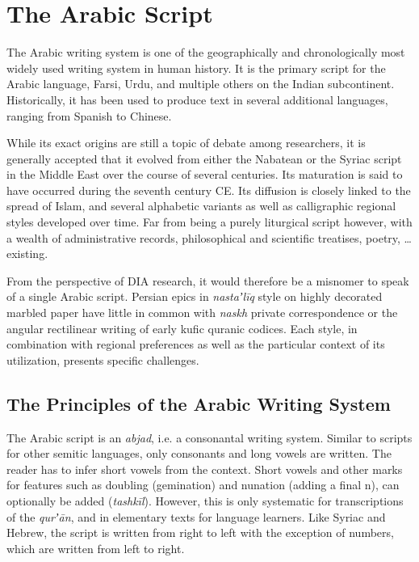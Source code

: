 \chapter{The Arabic Script}
\label{ch:arabic}
\thispagestyle{empty}
\newpage
{}

The Arabic writing system is one of the geographically and chronologically most
widely used writing system in human history. It is the primary script for the
Arabic language, Farsi, Urdu, and multiple others on the Indian subcontinent.
Historically, it has been used to produce text in several additional languages,
ranging from Spanish to Chinese.

While its exact origins are still a topic of debate among researchers, it is
generally accepted that it evolved from either the Nabatean or the Syriac
script in the Middle East over the course of several centuries. Its maturation
is said to have occurred during the seventh century CE. Its diffusion is
closely linked to the spread of Islam, and several alphabetic variants as well
as calligraphic regional styles developed over time. Far from being a purely
liturgical script however, with a wealth of administrative records,
philosophical and scientific treatises, poetry, \dots existing.

From the perspective of DIA research, it would therefore be a misnomer to speak
of a single Arabic script. Persian epics in \emph{nastaʼlīq} style on highly
decorated marbled paper have little in common with \emph{naskh} private
correspondence or the angular rectilinear writing of early kufic quranic
codices. Each style, in combination with regional preferences as well as the
particular context of its utilization, presents specific challenges.

\section{The Principles of the Arabic Writing System}

The Arabic script is an \emph{abjad}, i.e. a consonantal writing system.
Similar to scripts for other semitic languages, only consonants and long vowels
are written. The reader has to infer short vowels from the context. Short
vowels and other marks for features such as doubling (gemination) and nunation
(adding a final n), can optionally be added (\emph{tashkīl}).
However, this is only systematic for transcriptions of the \emph{qurʼān}, and in
elementary texts for language learners. Like Syriac and Hebrew, the script is
written from right to left with the exception of numbers, which are written
from left to right.

